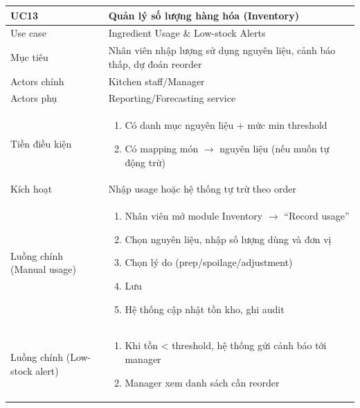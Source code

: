 \begin{longtable}{|>{\raggedright\arraybackslash}p{}|>{\raggedright\arraybackslash}p{}|}
\hline
\textbf{UC13} & \textbf{Quản lý số lượng hàng hóa (Inventory)} \\
\hline
Use case & Ingredient Usage \& Low-stock Alerts \\
\hline
Mục tiêu & Nhân viên nhập lượng sử dụng nguyên liệu, cảnh báo thấp, dự đoán reorder \\
\hline
Actors chính & Kitchen staff/Manager \\
\hline
Actors phụ & Reporting/Forecasting service \\
\hline
Tiền điều kiện &
\vspace{-0.5em}
\begin{enumerate}[leftmargin=*]
\item Có danh mục nguyên liệu + mức min threshold
\item Có mapping món $\rightarrow$ nguyên liệu (nếu muốn tự động trừ)
\end{enumerate}
\vspace{-0.5em}
\\
\hline
Kích hoạt & Nhập usage hoặc hệ thống tự trừ theo order \\
\hline
Luồng chính (Manual usage) &
\vspace{-0.5em}
\begin{enumerate}[leftmargin=*]
\item Nhân viên mở module Inventory $\rightarrow$ “Record usage”
\item Chọn nguyên liệu, nhập số lượng dùng và đơn vị
\item Chọn lý do (prep/spoilage/adjustment)
\item Lưu
\item Hệ thống cập nhật tồn kho, ghi audit
\end{enumerate}
\vspace{-0.5em}
\\
\hline
Luồng chính (Low-stock alert) &
\vspace{-0.5em}
\begin{enumerate}[leftmargin=*]
\item Khi tồn < threshold, hệ thống gửi cảnh báo tới manager
\item Manager xem danh sách cần reorder
\end{enumerate}
\vspace{-0.5em}

\end{longtable}
